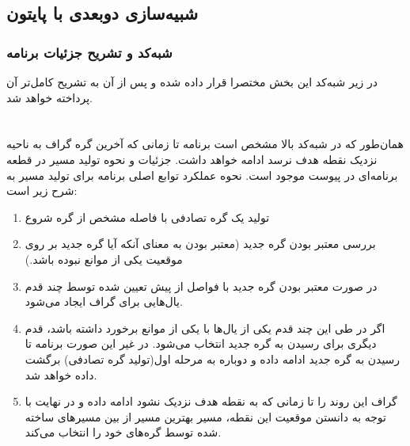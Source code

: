 


\subsection{شبیه‌سازی دوبعدی با پایتون}


\subsubsection{شبه‌کد و تشریح جزئیات برنامه}
در زیر شبه‌کد این بخش مختصرا قرار داده شده و پس از آن به تشریح کامل‌تر آن پرداخته خواهد شد.
\section*{}
\begin{latin}
	
\end{latin}

همان‌طور که در شبه‌کد بالا مشخص است برنامه تا زمانی که آخرین گره گراف به ناحیه نزدیک نقطه هدف نرسد ادامه خواهد داشت. جزئیات و نحوه تولید مسیر در قطعه برنامه‌ای در پیوست موجود است. نحوه عملکرد توابع اصلی برنامه برای تولید مسیر به شرح زیر است:
\begin{enumerate}
	\item
	تولید یک گره تصادفی با فاصله مشخص از گره شروع
	\item
	بررسی معتبر بودن گره جدید (معتبر بودن به معنای آنکه آیا گره جدید بر روی موقعیت یکی از موانع نبوده باشد.)
	\item
	در صورت معتبر بودن گره جدید با فواصل از پیش تعیین شده توسط چند قدم یال‌هایی برای گراف ایجاد می‌شود.
	\item
	اگر در طی این چند قدم یکی از یال‌ها با یکی از موانع برخورد داشته باشد، قدم دیگری برای رسیدن به گره جدید انتخاب می‌شود. در غیر این صورت برنامه تا رسیدن به گره جدید ادامه داده و دوباره به مرحله اول(تولید گره تصادفی) برگشت داده خواهد شد.
	\item
	گراف این روند را تا زمانی که به نقطه هدف نزدیک نشود ادامه داده و در نهایت با توجه به دانستن موقعیت این نقطه، مسیر بهترین مسیر از بین مسیر‌های ساخته شده توسط گره‌های خود را انتخاب می‌کند.
\end{enumerate}


